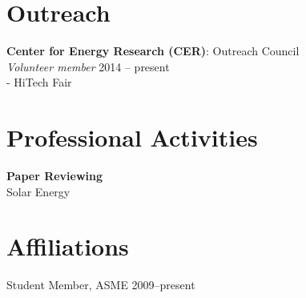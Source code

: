 \documentclass[]{res}
\begin{document}
\begin{resume}
\section{Outreach}
\vspace{0.1in}
%

\textbf{Center for Energy Research (CER)}: Outreach Council \\
\textit{Volunteer member} \hfill 2014 -- present \\
- HiTech Fair


\section{Professional Activities}
\vspace{0.1in}

\textbf{Paper Reviewing} \\
Solar Energy \\


\section{Affiliations}
\vspace{0.1in}
Student Member, ASME \hfill 2009--present \\



\end{resume}
\end{document}
